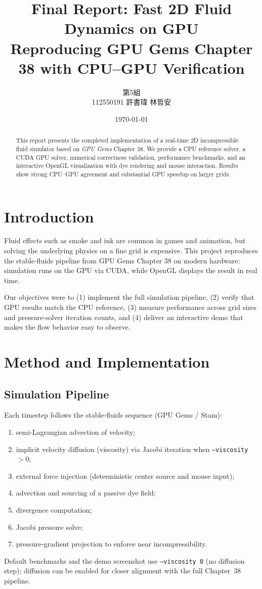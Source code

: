 \documentclass[10pt,a4paper]{article}
\title{\textbf{Final Report: Fast 2D Fluid Dynamics on GPU}\\
\large Reproducing GPU Gems Chapter 38 with CPU--GPU Verification}
\author{第5組\\
112550191 \quad 許書瑋 \qquad 112550052 \quad 林哲安}
\date{\today}
\begin{document}
\maketitle
\thispagestyle{empty}

\begin{abstract}
This report presents the completed implementation of a real-time 2D incompressible fluid simulator based on \textit{GPU Gems} Chapter 38. We provide a CPU reference solver, a CUDA GPU solver, numerical correctness validation, performance benchmarks, and an interactive OpenGL visualization with dye rendering and mouse interaction. Results show strong CPU--GPU agreement and substantial GPU speedup on larger grids.
\end{abstract}

\section{Introduction}
Fluid effects such as smoke and ink are common in games and animation, but solving the underlying physics on a fine grid is expensive. This project reproduces the stable-fluids pipeline from GPU Gems Chapter 38 on modern hardware: simulation runs on the GPU via CUDA, while OpenGL displays the result in real time.

Our objectives were to (1) implement the full simulation pipeline, (2) verify that GPU results match the CPU reference, (3) measure performance across grid sizes and pressure-solver iteration counts, and (4) deliver an interactive demo that makes the flow behavior easy to observe.

\section{Method and Implementation}
\subsection{Simulation Pipeline}
Each timestep follows the stable-fluids sequence (GPU Gems / Stam):
\begin{enumerate}
    \item semi-Lagrangian advection of velocity;
    \item implicit velocity diffusion (viscosity) via Jacobi iteration when \texttt{--viscosity} $> 0$;
    \item external force injection (deterministic center source and mouse input);
    \item advection and sourcing of a passive dye field;
    \item divergence computation;
    \item Jacobi pressure solve;
    \item pressure-gradient projection to enforce near incompressibility.
\end{enumerate}
Default benchmarks and the demo screenshot use \texttt{--viscosity 0} (no diffusion step); diffusion can be enabled for closer alignment with the full Chapter~38 pipeline.
\end{document}
